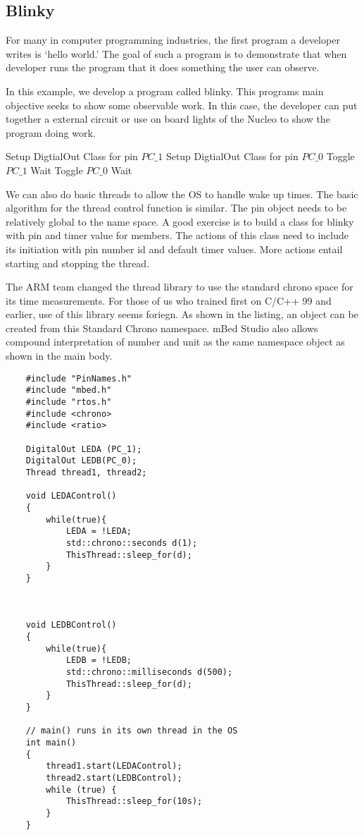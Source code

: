 \documentclass{article}
\begin{document}


\subsection{Blinky} %
\label{sub:blinky}

For many in computer programming industries, the first program a developer writes is `hello world.'  The goal of such a program is to demonstrate that when developer runs the program that it does something the user can observe.  

In this example, we develop a program called blinky.  This programs main objective seeks to show some observable work.  In this case, the developer can put together a external circuit or use on board lights of the Nucleo to show the program doing work.  

\begin{algorithmic}
	\STATE Setup DigtialOut Class for pin $PC\_1$
	\STATE Setup DigtialOut Class for pin $PC\_0$ 
		\STATE Toggle $PC\_1$
		\STATE Wait 
		\STATE Toggle $PC\_0$
		\STATE Wait
	\ENDWHILE
\end{algorithmic}

We can also do basic threads to allow the OS to handle wake up times.  The basic algorithm for the thread control function is similar.  The pin object needs to be relatively global to the name space.  A good exercise is to build a class for blinky with pin and timer value for members.  The actions of this class need to include its initiation with pin number id and default timer values.  More actions entail starting and stopping the thread.  

The ARM team changed the thread library to use the standard chrono space for its time measurements.  For those of us who trained first on C/C++ 99 and earlier, use of this library seems foriegn.  As shown in the listing, an object can be created from this Standard Chrono namespace.  mBed Studio also allows compound interpretation of number and unit as the same namespace object as shown in the main body.

\begin{lstlisting}
	#include "PinNames.h"
	#include "mbed.h"
	#include "rtos.h"
	#include <chrono>
	#include <ratio>

	DigitalOut LEDA (PC_1);
	DigitalOut LEDB(PC_0);
	Thread thread1, thread2;

	void LEDAControl()
	{
	    while(true){
	        LEDA = !LEDA;
	        std::chrono::seconds d(1);
	        ThisThread::sleep_for(d);
	    }
	}



	void LEDBControl()
	{
	    while(true){
	        LEDB = !LEDB;
	        std::chrono::milliseconds d(500);
	        ThisThread::sleep_for(d);
	    }
	}

	// main() runs in its own thread in the OS
	int main()
	{
	    thread1.start(LEDAControl);
	    thread2.start(LEDBControl);
	    while (true) {
	        ThisThread::sleep_for(10s);
	    }
	}
\end{lstlisting}
\end{document}
